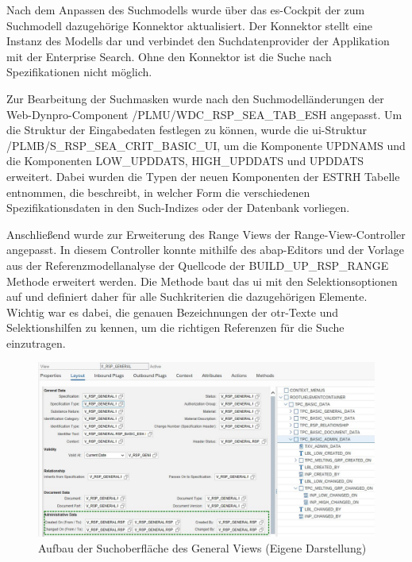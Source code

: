 Nach dem Anpassen des Suchmodells wurde über das \ac{es}-Cockpit der zum Suchmodell dazugehörige Konnektor aktualisiert. Der Konnektor stellt eine Instanz des Modells dar und verbindet den Suchdatenprovider der Applikation mit der Enterprise Search. Ohne den Konnektor ist die Suche nach Spezifikationen nicht möglich. 


Zur Bearbeitung der Suchmasken wurde nach den Suchmodelländerungen der Web-Dynpro-Component /PLMU/WDC\_RSP\_SEA\_TAB\_ESH angepasst. Um die Struktur der Eingabedaten festlegen zu können, wurde die \ac{ui}-Struktur /PLMB/S\_RSP\_SEA\_CRIT\_BASIC\_UI, um die Komponente UPDNAMS und die Komponenten LOW\_UPDDATS, HIGH\_UPDDATS und UPDDATS erweitert. Dabei wurden die Typen der neuen Komponenten der ESTRH Tabelle entnommen, die beschreibt, in welcher Form die verschiedenen Spezifikationsdaten in den Such-Indizes oder der Datenbank vorliegen.

Anschließend wurde zur Erweiterung des Range Views der Range-View-Controller angepasst. In diesem Controller konnte mithilfe des \acs{abap}-Editors und der Vorlage aus der Referenzmodellanalyse der Quellcode der BUILD\_UP\_RSP\_RANGE Methode erweitert werden. Die Methode baut das \ac{ui} mit den Selektionsoptionen auf und definiert daher für alle Suchkriterien die dazugehörigen Elemente. Wichtig war es dabei, die genauen Bezeichnungen der \acs{otr}-Texte und Selektionshilfen zu kennen, um die richtigen Referenzen für die Suche einzutragen. 

\begin{figure}[htbp]
    \centering
    \includegraphics[width=1\textwidth]{img/NViewLayout.JPG}
    \caption[Aufbau der Suchoberfläche des General Views]{Aufbau der Suchoberfläche des General Views (Eigene Darstellung)}
    \label{fig:NViewLayout}
\end{figure}



